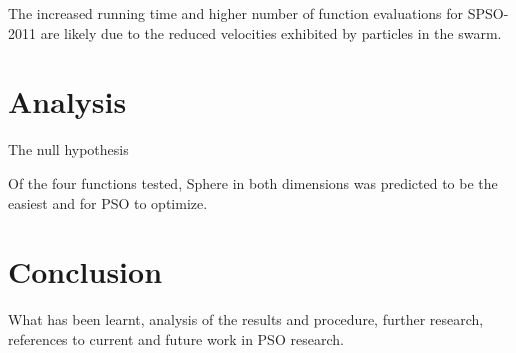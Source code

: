 \documentclass{csfourzero}
\begin{document}


The increased running time and higher number of function evaluations for
SPSO-2011 are likely due to the reduced velocities exhibited by particles in the
swarm.

\section{Analysis}

The null hypothesis 


Of the four functions tested, Sphere in both dimensions was predicted to be the
easiest and for PSO to optimize. %



\section{Conclusion}

What has been learnt, analysis of the results and procedure, further research,
references to current and future work in PSO research.


\end{document}
